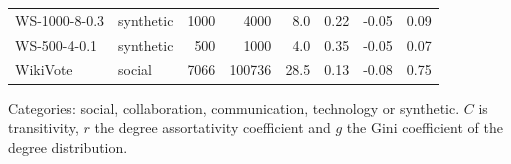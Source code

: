 \begin{table}[htbp]
\begin{tabular}{l l r r r r r r}
WS-1000-8-0.3 & synthetic & 1000 & 4000 & 8.0 & 0.22 & -0.05 & 0.09 \\
WS-500-4-0.1 & synthetic & 500 & 1000 & 4.0 & 0.35 & -0.05 & 0.07 \\
WikiVote & social & 7066 & 100736 & 28.5 & 0.13 & -0.08 & 0.75 \\
\bottomrule
\end{tabular}
\par\vspace{2pt}\begin{minipage}{\linewidth}\footnotesize Categories: social, collaboration, communication, technology or synthetic. $C$ is transitivity, $r$ the degree assortativity coefficient and $g$ the Gini coefficient of the degree distribution.\end{minipage}
\end{table}
